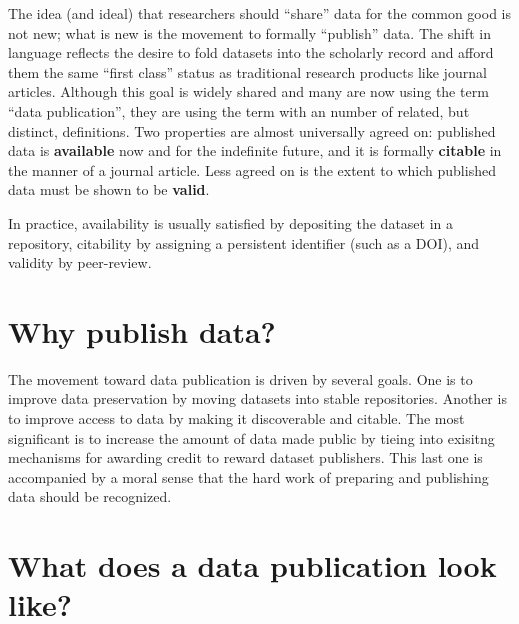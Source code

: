 \documentclass[10pt,a4paper,twocolumn]{article}
\begin{document}
The idea (and ideal) that researchers should ``share'' data for the common good is not new; what is new is the movement to formally ``publish'' data.
The shift in language reflects the desire to fold datasets into the scholarly record and afford them the same ``first class'' status as traditional research products like journal articles.
Although this goal is widely shared and many are now using the term ``data publication'', they are using the term with an number of related, but distinct, definitions.
Two properties are almost universally agreed on: published data is \textbf{available} now and for the indefinite future, and it is formally \textbf{citable} in the manner of a journal article. 
Less agreed on is the extent to which published data must be shown to be \textbf{valid}.


In practice, availability is usually satisfied by depositing the dataset in a repository, citability by assigning a persistent identifier (such as a DOI), and validity by peer-review.

\section*{Why publish data?}\label{why-publish-data}

The movement toward data publication is driven by several goals.
One is to improve data preservation by moving datasets into stable repositories.
Another is to improve access to data by making it discoverable and citable.
The most significant is to increase the amount of data made public by tieing into exisitng mechanisms for awarding credit to reward dataset publishers.
This last one is accompanied by a moral sense that the hard work of preparing and publishing data should be recognized.

\section*{What does a data publication look like?}\label{what-does-a-data-publication-look-like}
\end{document}

